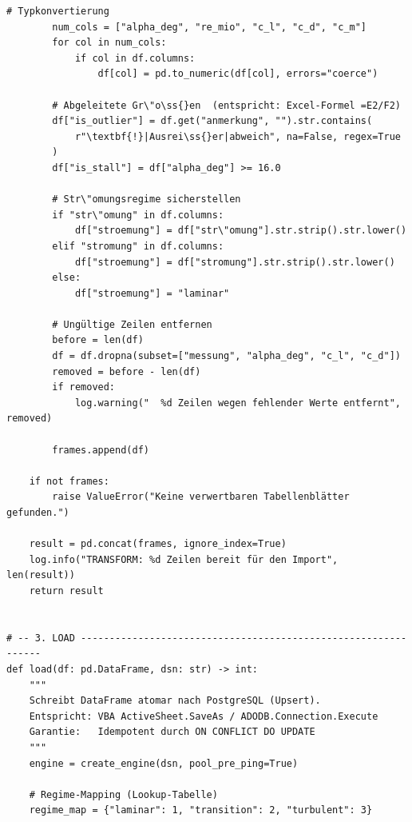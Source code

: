 \documentclass[12pt,a4paper]{report}
\theoremstyle{definition}
\theoremstyle{remark}
\begin{document}
\begin{lstlisting}[style=python, caption={migrate.py: Vollständige ETL-Pipeline}, label=lst:etl]
        # Typkonvertierung
        num_cols = ["alpha_deg", "re_mio", "c_l", "c_d", "c_m"]
        for col in num_cols:
            if col in df.columns:
                df[col] = pd.to_numeric(df[col], errors="coerce")

        # Abgeleitete Gr\"o\ss{}en  (entspricht: Excel-Formel =E2/F2)
        df["is_outlier"] = df.get("anmerkung", "").str.contains(
            r"\textbf{!}|Ausrei\ss{}er|abweich", na=False, regex=True
        )
        df["is_stall"] = df["alpha_deg"] >= 16.0

        # Str\"omungsregime sicherstellen
        if "str\"omung" in df.columns:
            df["stroemung"] = df["str\"omung"].str.strip().str.lower()
        elif "stromung" in df.columns:
            df["stroemung"] = df["stromung"].str.strip().str.lower()
        else:
            df["stroemung"] = "laminar"

        # Ungültige Zeilen entfernen
        before = len(df)
        df = df.dropna(subset=["messung", "alpha_deg", "c_l", "c_d"])
        removed = before - len(df)
        if removed:
            log.warning("  %d Zeilen wegen fehlender Werte entfernt", removed)

        frames.append(df)

    if not frames:
        raise ValueError("Keine verwertbaren Tabellenblätter gefunden.")

    result = pd.concat(frames, ignore_index=True)
    log.info("TRANSFORM: %d Zeilen bereit für den Import", len(result))
    return result


# -- 3. LOAD ---------------------------------------------------------------
def load(df: pd.DataFrame, dsn: str) -> int:
    """
    Schreibt DataFrame atomar nach PostgreSQL (Upsert).
    Entspricht: VBA ActiveSheet.SaveAs / ADODB.Connection.Execute
    Garantie:   Idempotent durch ON CONFLICT DO UPDATE
    """
    engine = create_engine(dsn, pool_pre_ping=True)

    # Regime-Mapping (Lookup-Tabelle)
    regime_map = {"laminar": 1, "transition": 2, "turbulent": 3}


\end{lstlisting}
\end{document}
